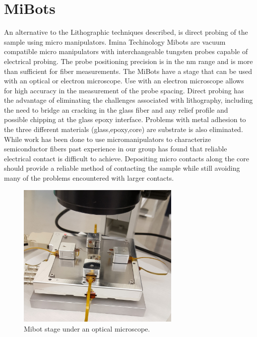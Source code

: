 \section{MiBots}
An alternative to the Lithographic techniques described, is direct probing of the sample using micro manipulators. Imina Techinology Mibots are vacuum compatible micro manipulators with interchangeable tungsten probes capable of electrical probing. The probe positioning precision is in the nm range and is more than sufficient for fiber measurements. The MiBots have a stage that can be used with an optical or electron microscope. Use with an electron microscope allows for high accuracy in the measurement of the probe spacing. Direct probing has the advantage of eliminating the challenges associated with lithography, including the need to bridge an cracking in the glass fiber and any relief profile and possible chipping at the glass epoxy interface. Problems with metal adhesion to the three different materials (glass,epoxy,core) are substrate is also eliminated. While work has been done to use micromanipulators to characterize semiconductor fibers \cite{Engel2016DirectPhotosynthesis} past experience in our group has found that reliable electrical contact is difficult to achieve. %
Depositing micro contacts along the core should provide a reliable method of contacting the sample while still avoiding many of the problems encountered with larger contacts.  



\begin{figure}[t]
  \centering
    \includegraphics[width=0.7\textwidth]{fig/MiBots/setup.jpg}
 \caption{Mibot stage under an optical microscope.}
\label{mibot}
\end{figure}

